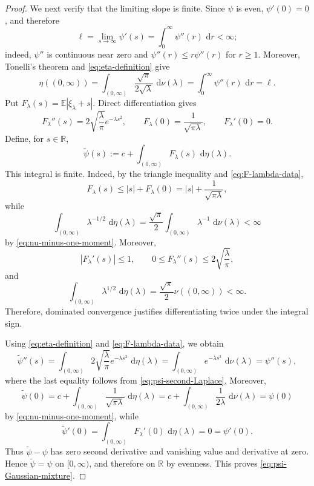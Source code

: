 \documentclass[11pt]{article}
\theoremstyle{definition}
\theoremstyle{remark}
\newcommand{\R}{\mathbb R}
\newcommand{\dd}{\,\mathrm d}
\newcommand{\E}{\mathbb E}
\newcommand{\abs}[1]{\left|#1\right|}
\begin{document}
\begin{proof}
We next verify that the limiting slope is finite.  Since $\psi$ is
even, $\psi'(0)=0$, and therefore
\[
 \ell=\lim_{s\to\infty}\psi'(s)
 =\int_0^\infty\psi''(r)\,\dd r<\infty;
\]
indeed, $\psi''$ is continuous near zero and
$\psi''(r)\leq r\psi''(r)$ for $r\geq1$.
Moreover, Tonelli's theorem and
\eqref{eq:eta-definition} give
\begin{equation}\label{eq:eta-total-mass}
 \eta((0,\infty))
 =\int_{(0,\infty)}\frac{\sqrt\pi}{2\sqrt\lambda}
       \,\dd\nu(\lambda)
 =\int_0^\infty\psi''(r)\,\dd r
 =\ell.
\end{equation}
Put $F_\lambda(s)=\E\abs{\xi_\lambda+s}$.  Direct differentiation
gives
\begin{equation}\label{eq:F-lambda-data}
 F_\lambda''(s)=2\sqrt{\frac\lambda\pi}e^{-\lambda s^2},
 \qquad
 F_\lambda(0)=\frac1{\sqrt{\pi\lambda}},
 \qquad
 F_\lambda'(0)=0.
\end{equation}
Define, for $s\in\R$,
\[
 \widetilde\psi(s)
:=c+\int_{(0,\infty)}F_\lambda(s)\,\dd\eta(\lambda).
\]
This integral is finite.  Indeed, by the triangle inequality and
\eqref{eq:F-lambda-data},
\[
 F_\lambda(s)
 \leq \abs{s}+F_\lambda(0)
 =\abs{s}+\frac1{\sqrt{\pi\lambda}},
\]
while
\[
 \int_{(0,\infty)}\lambda^{-1/2}\,\dd\eta(\lambda)
 =\frac{\sqrt\pi}{2}
   \int_{(0,\infty)}\lambda^{-1}\,\dd\nu(\lambda)
 <\infty
\]
by \eqref{eq:nu-minus-one-moment}.  Moreover,
\[
 \abs{F_\lambda'(s)}\leq1,
 \qquad
 0\leq F_\lambda''(s)
 \leq2\sqrt{\frac{\lambda}{\pi}},
\]
and
\[
 \int_{(0,\infty)}\lambda^{1/2}\,\dd\eta(\lambda)
 =\frac{\sqrt\pi}{2}\nu((0,\infty))<\infty.
\]
Therefore, dominated convergence justifies differentiating twice
under the integral sign.






Using \eqref{eq:eta-definition} and
\eqref{eq:F-lambda-data}, we obtain
$$
 \widetilde\psi''(s)
 =\int_{(0,\infty)}
   2\sqrt{\frac{\lambda}{\pi}}e^{-\lambda s^2}
\,\dd\eta(\lambda)=\int_{(0,\infty)}e^{-\lambda s^2}\,\dd\nu(\lambda)
 =\psi''(s),
 $$
where the last equality follows from
\eqref{eq:psi-second-Laplace}.  Moreover,
$$
 \widetilde\psi(0)
 =c+\int_{(0,\infty)} \frac1{\sqrt{\pi\lambda}}\,\dd\eta(\lambda) =c+\int_{(0,\infty)}
   \frac1{2\lambda}\,\dd\nu(\lambda)
 =\psi(0)
$$
by \eqref{eq:nu-minus-one-moment}, while
\[
 \widetilde\psi'(0)
 =\int_{(0,\infty)}F_\lambda'(0)\,\dd\eta(\lambda)
 =0=\psi'(0).
\]
Thus $\widetilde\psi-\psi$ has zero second derivative and vanishing
value and derivative at zero.  Hence $\widetilde\psi=\psi$ on
$[0,\infty)$, and therefore on $\R$ by evenness.  This proves
\eqref{eq:psi-Gaussian-mixture}.



\end{proof}
\end{document}
